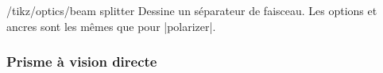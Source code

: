 \documentclass[a4paper]{ltxdoc}
\begin{document}
\begin{stylekey}{/tikz/optics/beam splitter}
Dessine un séparateur de faisceau. Les options et ancres sont les mêmes que pour |polarizer|.

\begin{codeexample}[width=6cm]
\end{codeexample}

\end{stylekey}


\subsubsection{Prisme à vision directe}
\end{document}
